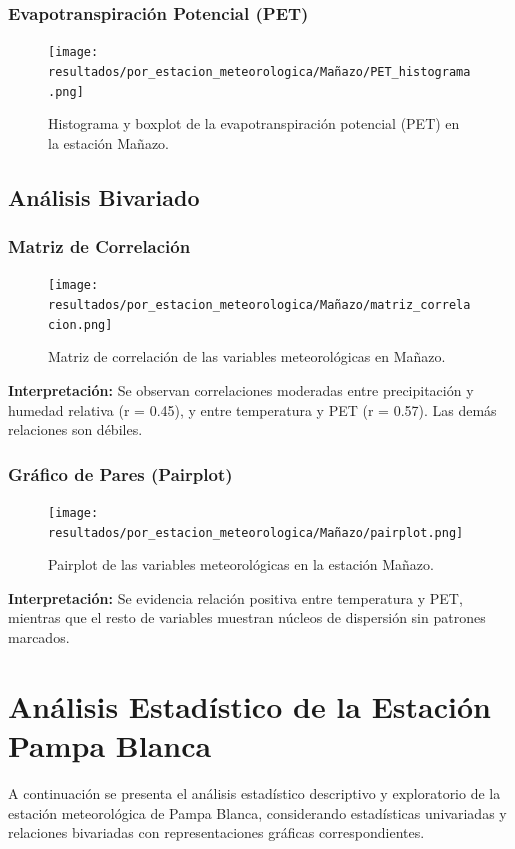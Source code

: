 \subsubsection*{Evapotranspiración Potencial (PET)}
\begin{figure}[H]
\centering
\texttt{[image: resultados/por\_estacion\_meteorologica/Mañazo/PET\_histograma.png]}
\caption{Histograma y boxplot de la evapotranspiración potencial (PET) en la estación Mañazo.}
\label{fig:manazo_PET}
\end{figure}

\subsection{Análisis Bivariado}

\subsubsection*{Matriz de Correlación}
\begin{figure}[H]
\centering
\texttt{[image: resultados/por\_estacion\_meteorologica/Mañazo/matriz\_correlacion.png]}
\caption{Matriz de correlación de las variables meteorológicas en Mañazo.}
\label{fig:manazo_corr}
\end{figure}
\textbf{Interpretación:} Se observan correlaciones moderadas entre precipitación y humedad relativa (r = 0.45), y entre temperatura y PET (r = 0.57). Las demás relaciones son débiles.

\subsubsection*{Gráfico de Pares (Pairplot)}
\begin{figure}[H]
\centering
\texttt{[image: resultados/por\_estacion\_meteorologica/Mañazo/pairplot.png]}
\caption{Pairplot de las variables meteorológicas en la estación Mañazo.}
\label{fig:manazo_pairplot}
\end{figure}
\textbf{Interpretación:} Se evidencia relación positiva entre temperatura y PET, mientras que el resto de variables muestran núcleos de dispersión sin patrones marcados.


\section{Análisis Estadístico de la Estación Pampa Blanca}

A continuación se presenta el análisis estadístico descriptivo y exploratorio de la estación meteorológica de Pampa Blanca, considerando estadísticas univariadas y relaciones bivariadas con representaciones gráficas correspondientes.

